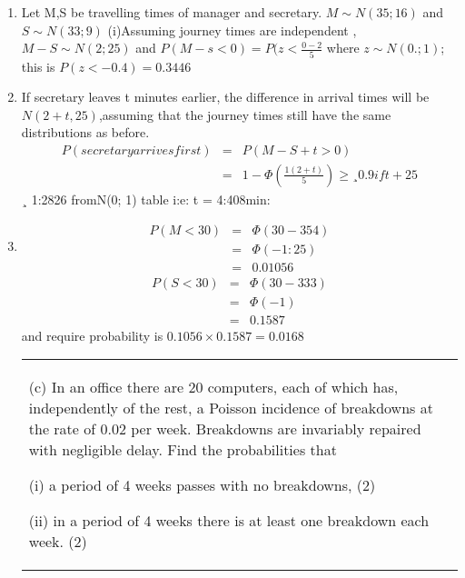 \documentclass[a4paper,12pt]{article}
\begin{document}
\begin{enumerate}
\begin{table}[ht!]
\begin{tabular}{|p{15cm}|}
 \\ \hline
      \end{tabular}
    \end{table}
\item Let M,S be travelling times of manager and secretary.
$M \sim N(35; 16)$ and $S \sim N(33; 9)$
(i)Assuming journey times are independent ,
$M - S \sim N(2; 25)$ and $P(M - s < 0) = P(z <
\frac{0 - 2}{5}$
where $z \sim N(0.; 1)$; this is $P(z < -0.4) = 0.3446$
\item If secretary leaves t minutes earlier, the difference in arrival times will be $N(2+t,25)$,assuming
that the journey times still have the same distributions as before.
\begin{eqnarray*}
P(secretary arrives first) &=& P(M - S + t > 0)\\
&=& 1 - \Phi (\frac{1(2+t)}{5}) \geq¸ 0.9 if
t + 2
5
\end{eqnarray*}
¸ 1:2826 fromN(0; 1) table i:e: t = 4:408min:
\item
\begin{eqnarray*}
P(M < 30) &=& \Phi( 30-35
4 ) \\ &=& \Phi(-1:25)\\ &=& 0.01056
\end{eqnarray*}
\begin{eqnarray*}
P(S < 30)  &=&  \Phi( 30-33
3 ) \\ &=&  \Phi(-1) \\ &=&  0.1587
\end{eqnarray*}
and require probability is $0.1056 \times 0.1587 = 0.0168$

\newpage
  \begin{table}[ht!]
     \centering
     \begin{tabular}{|p{15cm}|}
     \hline  
(c) In an office there are 20 computers, each of which has, independently of the rest, a Poisson incidence of breakdowns at the rate of 0.02 per week.  Breakdowns are invariably repaired with negligible delay.  Find the probabilities that 
 
(i) a period of 4 weeks passes with no breakdowns, 
(2) 
 
(ii) in a period of 4 weeks there is at least one breakdown each week. (2) 
 

\end{tabular}
\end{table}
\end{enumerate}
\end{document}
